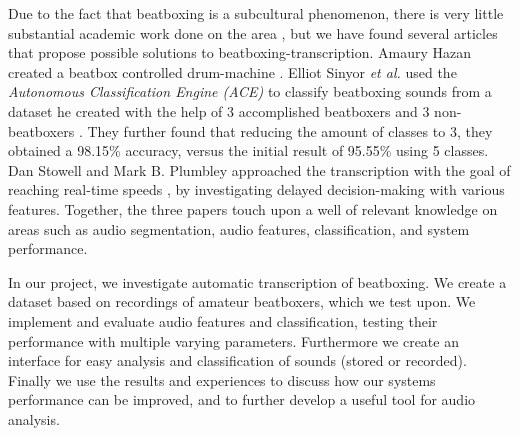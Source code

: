 Due to the fact that beatboxing is a subcultural phenomenon, there is very little substantial academic work done on the area \citep{Stowell2008}, but we have found several articles that propose possible solutions to beatboxing-transcription. Amaury Hazan created a beatbox controlled drum-machine \citep{Hazan2005}. Elliot Sinyor \textit{et al.} used the \textit{Autonomous Classification Engine (ACE)} to classify beatboxing sounds from a dataset he created with the help of 3 accomplished beatboxers and 3 non-beatboxers \citep{Sinyor05}. They further found that reducing the amount of classes to 3, they obtained a 98.15\% accuracy, versus the initial result of 95.55\% using 5 classes. Dan Stowell and Mark B. Plumbley approached the transcription with the goal of reaching real-time speeds \citep{Stowell2008}, by investigating delayed decision-making with various features. Together, the three papers touch upon a well of relevant knowledge on areas such as audio segmentation, audio features, classification, and system performance.


In our project, we investigate automatic transcription of beatboxing. We create a dataset based on recordings of amateur beatboxers, which we test upon. We implement and evaluate audio features and classification, testing their performance with multiple varying parameters.
Furthermore we create an interface for easy analysis and classification of sounds (stored or recorded). Finally we use the results and experiences to discuss how our systems performance can be improved, and to further develop a useful tool for audio analysis.


